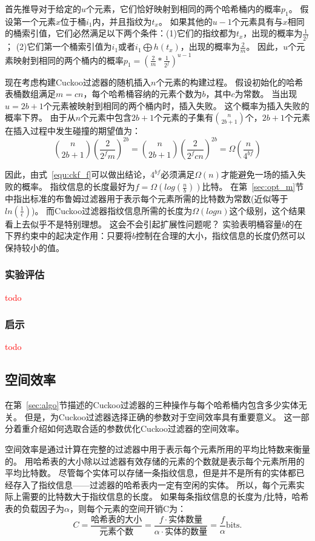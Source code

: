 首先推导对于给定的$u$个元素，它们恰好映射到相同的两个哈希桶内的概率$p_1$。
假设第一个元素$x$位于桶$i_1$内，并且指纹为$t_x$。
如果其他的$u-1$个元素具有与$x$相同的桶索引值，它们必然满足以下两个条件：(1)它们的指纹都为$t_x$，出现的概率为$\frac{1}{2^f}$；
(2)它们第一个桶索引值为$i_1$或者$i_1 \bigoplus h(t_x)$，出现的概率为$\frac{2}{m}$。
因此，$u$个元素映射到相同的两个桶内的概率$p_1 = (\frac{2}{m}\ast \frac{1}{2^f})^{u-1}$

现在考虑构建Cuckoo过滤器的随机插入$n$个元素的构建过程。
假设初始化的哈希表桶数组满足$m = cn$，每个哈希桶容纳的元素个数为$b$，其中$c$为常数。
当出现$u = 2b+1$个元素被映射到相同的两个桶内时，插入失败。
这个概率为插入失败的概率下界。
由于从$n$个元素中包含$2b+1$个元素的子集有$\binom{n}{2b+1}$个，$2b+1$个元素在插入过程中发生碰撞的期望值为：
\begin{equation}
\binom{n}{2b+1}(\frac{2}{2^fm})^{2b} = \binom{n}{2b+1}(\frac{2}{2^f{cn}})^{2b} = \Omega(\frac{n}{4^{bf}}) 
\label{equ:ckf_f}
\end{equation}

因此，由式~\ref{equ:ckf_f}可以做出结论，$4^{bf}$必须满足$\Omega(n)$才能避免一场的插入失败的概率。
指纹信息的长度最好为$f = \Omega(log(\frac{n}{b}))$比特。
在第~\ref{sec:opt_m}节中指出标准的布鲁姆过滤器用于表示每个元素所需的比特数为常数(近似等于$ln(\frac{1}{\epsilon})$)。
而Cuckoo过滤器指纹信息所需的长度为$\Omega(logn)$这个级别，这个结果看上去似乎不是特别理想。
这会不会引起扩展性问题呢？
实验表明桶容量$b$的在下界约束中的起决定作用：只要将$b$控制在合理的大小，指纹信息的长度仍然可以保持较小的值。

\subsubsection{实验评估}
\textcolor{red}{todo}
\subsubsection{启示}
\textcolor{red}{todo}

\subsection{空间效率}
在第~\ref{sec:algo}节描述的Cuckoo过滤器的三种操作与每个哈希桶内包含多少实体无关。
但是，为Cuckoo过滤器选择正确的参数对于空间效率具有重要意义。
这一部分着重介绍如何选取合适的参数优化Cuckoo过滤器的空间效率。

空间效率是通过计算在完整的过滤器中用于表示每个元素所用的平均比特数来衡量的。
用哈希表的大小除以过滤器有效存储的元素的个数就是表示每个元素所用的平均比特数。
尽管每个实体可以存储一条指纹信息，但是并不是所有的实体都已经存入了指纹信息——过滤器的哈希表内一定有空闲的实体。
所以，每个元素实际上需要的比特数大于指纹信息的长度。
如果每条指纹信息的长度为$f$比特，哈希表的负载因子为$\alpha$，则每个元素的空间开销C为：
\begin{equation}
C = \frac{\text{哈希表的大小}}{\text{元素个数}} = \frac{f\cdot \text{实体数量}}{\alpha \cdot \text{实体的数量}} = \frac{f}{\alpha} \text{bits.}
\label{equ:space_cost}
\end{equation}

